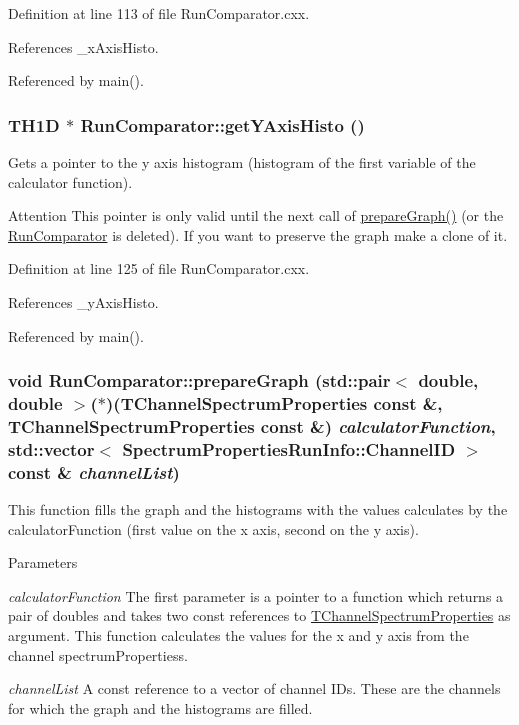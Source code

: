 Definition at line 113 of file RunComparator.cxx.

References \_\-xAxisHisto.

Referenced by main().\hypertarget{class_run_comparator_a91ce139df30b4af12e1d64d3421ff570}{
\subsubsection[{getYAxisHisto}]{\setlength{\rightskip}{0pt plus 5cm}TH1D $\ast$ RunComparator::getYAxisHisto ()}}
\label{class_run_comparator_a91ce139df30b4af12e1d64d3421ff570}


Gets a pointer to the y axis histogram (histogram of the first variable of the calculator function). \begin{DoxyAttention}{Attention}
This pointer is only valid until the next call of \hyperlink{class_run_comparator_a31b28d33c185a2be5a17c42525dd2ec0}{prepareGraph()} (or the \hyperlink{class_run_comparator}{RunComparator} is deleted). If you want to preserve the graph make a clone of it. 
\end{DoxyAttention}


Definition at line 125 of file RunComparator.cxx.

References \_\-yAxisHisto.

Referenced by main().\hypertarget{class_run_comparator_a23682ec1792eea496942f83d8b9a36e8}{
\subsubsection[{prepareGraph}]{\setlength{\rightskip}{0pt plus 5cm}void RunComparator::prepareGraph (std::pair$<$ double, double $>$($\ast$)({\bf TChannelSpectrumProperties} const \&, {\bf TChannelSpectrumProperties} const \&) {\em calculatorFunction}, \/  std::vector$<$ {\bf SpectrumPropertiesRunInfo::ChannelID} $>$ const \& {\em channelList})}}
\label{class_run_comparator_a23682ec1792eea496942f83d8b9a36e8}


This function fills the graph and the histograms with the values calculates by the calculatorFunction (first value on the x axis, second on the y axis). 
\begin{DoxyParams}{Parameters}
\item[{\em calculatorFunction}]The first parameter is a pointer to a function which returns a pair of doubles and takes two const references to \hyperlink{class_t_channel_spectrum_properties}{TChannelSpectrumProperties} as argument. This function calculates the values for the x and y axis from the channel spectrumPropertiess. \item[{\em channelList}]A const reference to a vector of channel IDs. These are the channels for which the graph and the histograms are filled. \end{DoxyParams}


